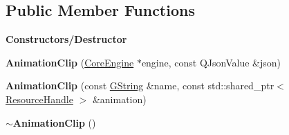 \subsection*{Public Member Functions}
\begin{Indent}\textbf{ Constructors/\+Destructor}\par
\begin{DoxyCompactItemize}
\item 
\mbox{\label{classrev_1_1_animation_clip_aa5b903c8151dd01ea8fd6e4647a8b1f6}} 
{\bfseries Animation\+Clip} (\mbox{\hyperlink{classrev_1_1_core_engine}{Core\+Engine}} $\ast$engine, const Q\+Json\+Value \&json)
\item 
\mbox{\label{classrev_1_1_animation_clip_a52aaa36e928cfe51807577240de3c7e1}} 
{\bfseries Animation\+Clip} (const \mbox{\hyperlink{classrev_1_1_g_string}{G\+String}} \&name, const std\+::shared\+\_\+ptr$<$ \mbox{\hyperlink{classrev_1_1_resource_handle}{Resource\+Handle}} $>$ \&animation)
\item 
\mbox{\label{classrev_1_1_animation_clip_aa6a5e89116d5f7ea7828b558240c277c}} 
{\bfseries $\sim$\+Animation\+Clip} ()
\end{DoxyCompactItemize}
\end{Indent}
